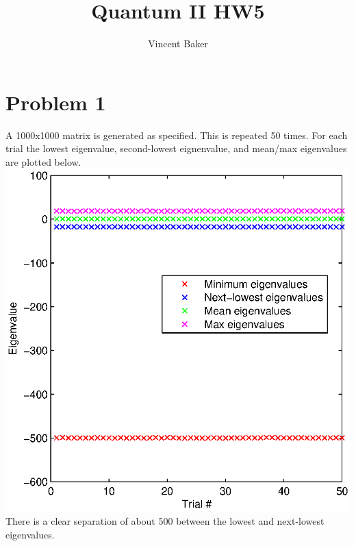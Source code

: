 \documentclass[a4paper,11pt]{article}
\title{Quantum II HW5}
\author{Vincent Baker}
\numberwithin{equation}{section}
\begin{document}
\maketitle

\section{Problem 1}
A 1000x1000 matrix is generated as specified. This is repeated 50 times. 
For each trial the lowest eigenvalue, second-lowest eignenvalue, and mean/max eigenvalues are plotted below.\\
\includegraphics{p1}
\\
There is a clear separation of about 500 between the lowest and next-lowest eigenvalues.
\end{document}
